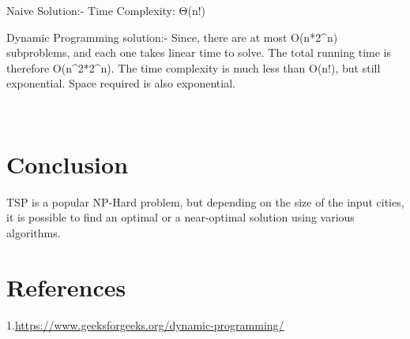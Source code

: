 \documentclass[conference]{IEEEtran}
\begin{document}
Naive Solution:-
Time Complexity: Θ(n!)

Dynamic Programming solution:-
Since, there are at most O(n*2^{n}) subproblems, and each one takes linear time to solve. The total running time is therefore O(n^{2}*2^{n}). The time complexity is much less than O(n!), but still exponential. Space required is also exponential.

\\


\section{Conclusion}
TSP is a popular NP-Hard problem, but depending on the size of the input cities, it is possible to find an optimal or a near-optimal solution using various algorithms.
 
\section{References}
\color{blue}1.{\url{https://www.geeksforgeeks.org/dynamic-programming/} }\\
\end{document}
